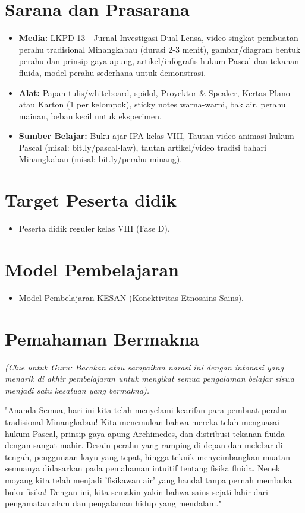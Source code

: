 \documentclass[12pt,a4paper]{article}
\begin{document}
\section{Sarana dan Prasarana}

\begin{itemize}
\item \textbf{Media:} LKPD 13 - Jurnal Investigasi Dual-Lensa, video singkat pembuatan perahu tradisional Minangkabau (durasi 2-3 menit), gambar/diagram bentuk perahu dan prinsip gaya apung, artikel/infografis hukum Pascal dan tekanan fluida, model perahu sederhana untuk demonstrasi.
\item \textbf{Alat:} Papan tulis/whiteboard, spidol, Proyektor \& Speaker, Kertas Plano atau Karton (1 per kelompok), sticky notes warna-warni, bak air, perahu mainan, beban kecil untuk eksperimen.
\item \textbf{Sumber Belajar:} Buku ajar IPA kelas VIII, Tautan video animasi hukum Pascal (misal: bit.ly/pascal-law), tautan artikel/video tradisi bahari Minangkabau (misal: bit.ly/perahu-minang).
\end{itemize}

\section{Target Peserta didik}

\begin{itemize}
\item Peserta didik reguler kelas VIII (Fase D).
\end{itemize}

\section{Model Pembelajaran}

\begin{itemize}
\item Model Pembelajaran KESAN (Konektivitas Etnosains-Sains).
\end{itemize}

\section{Pemahaman Bermakna}
\textit{(Clue untuk Guru: Bacakan atau sampaikan narasi ini dengan intonasi yang menarik di akhir pembelajaran untuk mengikat semua pengalaman belajar siswa menjadi satu kesatuan yang bermakna).}

\begin{tcolorbox}[mystyle]
"Ananda Semua, hari ini kita telah menyelami kearifan para pembuat perahu tradisional Minangkabau! Kita menemukan bahwa mereka telah menguasai hukum Pascal, prinsip gaya apung Archimedes, dan distribusi tekanan fluida dengan sangat mahir. Desain perahu yang ramping di depan dan melebar di tengah, penggunaan kayu yang tepat, hingga teknik menyeimbangkan muatan—semuanya didasarkan pada pemahaman intuitif tentang fisika fluida. Nenek moyang kita telah menjadi 'fisikawan air' yang handal tanpa pernah membuka buku fisika! Dengan ini, kita semakin yakin bahwa sains sejati lahir dari pengamatan alam dan pengalaman hidup yang mendalam."
\end{tcolorbox}
\end{document}
